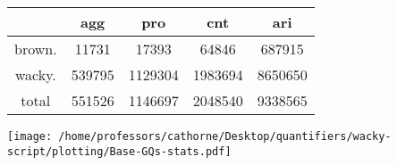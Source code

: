\documentclass[a4,10pt]{article}
\begin{document}
\begin{sidewaystable}[p]
\tiny{\begin{tabular}{|c|c|c|c|c|}
 & agg & pro & cnt & ari\\
\hline
brown. & 11731 & 17393 & 64846 & 687915\\
wacky. & 539795 & 1129304 & 1983694 & 8650650\\
\hline
total & 551526 & 1146697 & 2048540 & 9338565
\end{tabular}}
\end{sidewaystable}



\vspace{0.2cm}

\begin{center}
\texttt{[image: /home/professors/cathorne/Desktop/quantifiers/wacky-script/plotting/Base-GQs-stats.pdf]}
\end{center}
\end{document}
